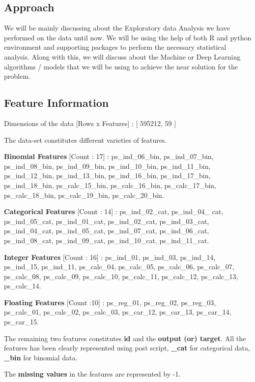 \subsection{Approach}
We will be mainly discussing about the Exploratory data Analysis we have  performed on the data until now. We will be using the help of both R and python environment and supporting packages to perform the necessary statistical analysis. Along with this, we will discuss  about  the  Machine  or  Deep  Learning  algorithms  / models that we will be using to achieve the near solution for the problem.

\subsection{Feature Information}

Dimensions of the data [Rows x Features] : [ 595212, 59 ]
 
The data-set constitutes different varieties of features.
 
 \textbf{Binomial Features} [Count : 17] :  ps\_ind\_06\_bin,  ps\_ind\_07\_bin, ps\_ind\_08\_bin, ps\_ind\_09\_bin, ps\_ind\_10\_bin, ps\_ind\_11\_bin, ps\_ind\_12\_bin, ps\_ind\_13\_bin, ps\_ind\_16\_bin, ps\_ind\_17\_bin, ps\_ind\_18\_bin, ps\_calc\_15\_bin, ps\_calc\_16\_bin, ps\_calc\_17\_bin, ps\_calc\_18\_bin, ps\_calc\_19\_bin, ps\_calc\_20\_bin.

 \textbf{Categorical Features} [Count : 14] : ps\_ind\_02\_cat,  ps\_ind\_04\_ cat, ps\_ind\_05\_cat, ps\_ind\_01\_cat, ps\_ind\_02\_cat,  ps\_ind\_03\_cat, ps\_ind\_04\_cat, ps\_ind\_05\_cat, ps\_ind\_07\_cat,  ps\_ind\_06\_cat, ps\_ind\_08\_cat, ps\_ind\_09\_cat, ps\_ind\_10\_cat,  ps\_ind\_11\_cat.

 \textbf{Integer Features} [Count : 16] : ps\_ind\_01, ps\_ind\_03, ps\_ind\_14, ps\_ind\_15, ps\_ind\_11, ps\_calc\_04, ps\_calc\_05, ps\_calc\_06, ps\_calc\_07, ps\_calc\_08, ps\_calc\_09, ps\_calc\_10, ps\_calc\_11, ps\_calc\_12, ps\_calc\_13, ps\_calc\_14.

 \textbf{Floating Features} [Count :10] : ps\_reg\_01, ps\_reg\_02, ps\_reg\_03, ps\_calc\_01, ps\_calc\_02, ps\_calc\_03, ps\_car\_12, ps\_car\_13, ps\_car\_14, ps\_car\_15.
 
The remaining two features constitutes \textbf{id} and the \textbf{output (or) target}. 
All the features has been clearly represented using post script, \textbf{\_cat} for categorical data, \textbf{\_bin} for binomial data.
 
The \textbf{missing values} in the features are represented by -1.

